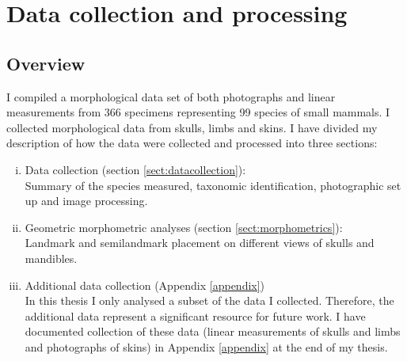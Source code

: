 
\chapter{Data collection and processing}
\label{chap:methods}



\section{Overview}

	I compiled a morphological data set of both photographs and linear measurements from 366 specimens representing 99 species of small mammals. 
	I collected morphological data from skulls, limbs and skins. I have divided my description of how the data were collected and processed into three sections:
	
	\begin{enumerate}[i.]
	
	\item Data collection (section \ref{sect:datacollection}): \\
	Summary of the species measured, taxonomic identification, photographic set up and image processing.
	
	\item Geometric morphometric analyses (section \ref{sect:morphometrics}):\\
	Landmark and semilandmark placement on different views of skulls and mandibles.
	
	
	\item Additional data collection (Appendix \ref{appendix}) \\
	In this thesis I only analysed a subset of the data I collected. Therefore, the additional data represent a significant resource for future work. I have documented collection of these data (linear measurements of skulls and limbs and photographs of skins) in Appendix \ref{appendix} at the end of my thesis.
	\end{enumerate} 


